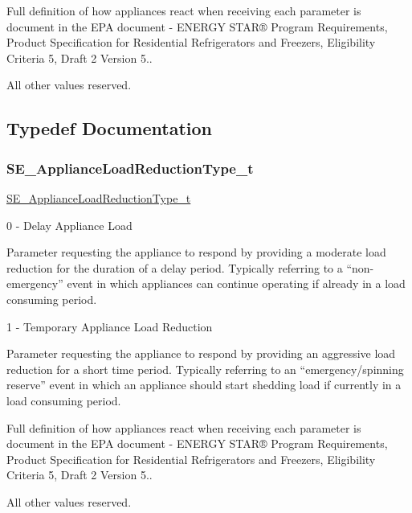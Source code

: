 Full definition of how appliances react when receiving each parameter is document in the E\+PA document -\/ E\+N\+E\+R\+GY S\+T\+A\+R® Program Requirements, Product Specification for Residential Refrigerators and Freezers, Eligibility Criteria 5, Draft 2 Version 5..

All other values reserved. 

\subsection{Typedef Documentation}
\mbox{\label{group__ApplianceLoadReductionType_ga05e14b2c51c55d623a23c75b2ccae048}} 
\subsubsection{\texorpdfstring{S\+E\+\_\+\+Appliance\+Load\+Reduction\+Type\+\_\+t}{SE\_ApplianceLoadReductionType\_t}}
{\footnotesize\ttfamily \hyperlink{group__ApplianceLoadReductionType_ga05e14b2c51c55d623a23c75b2ccae048}{S\+E\+\_\+\+Appliance\+Load\+Reduction\+Type\+\_\+t}}

0 -\/ Delay Appliance Load

Parameter requesting the appliance to respond by providing a moderate load reduction for the duration of a delay period. Typically referring to a “non-\/emergency” event in which appliances can continue operating if already in a load consuming period.

1 -\/ Temporary Appliance Load Reduction

Parameter requesting the appliance to respond by providing an aggressive load reduction for a short time period. Typically referring to an “emergency/spinning reserve” event in which an appliance should start shedding load if currently in a load consuming period.

Full definition of how appliances react when receiving each parameter is document in the E\+PA document -\/ E\+N\+E\+R\+GY S\+T\+A\+R® Program Requirements, Product Specification for Residential Refrigerators and Freezers, Eligibility Criteria 5, Draft 2 Version 5..

All other values reserved. 